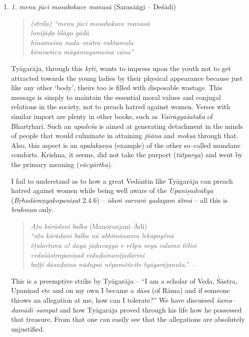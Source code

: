 \begin{enumerate}
\item 
 \textit{1. menu jūci mosabokave manasā} (Sarasāṅgi – Deśādi)

\begin{verse}
\textit{(strīla) “menu jūci mosabokave manasā}\\\textit{lonijāḍa līlāgu gādā}\\\textit{hīnamaina mala–mūtra–raktamula}\\\textit{kiravaṁcu māyāmayamaina cāna”}
\end{verse}

 Tyāgarāja, through this \textit{kṛti,} wants to impress upon the youth not to get attracted towards the young ladies by their physical appearance because just like any other ‘body’, theirs too is filled with disposable wastage. This message is simply to maintain the essential moral values and conjugal relations in the society, not to preach hatred against women. Verses with similar import are plenty in other books, such as \textit{Vairāgyaśataka} of Bhartṛhari. Such an \textit{upadeśa} is aimed at generating detachment in the minds of people that would culminate in attaining \textit{jñāna} and \textit{mokṣa} through that. Also, this aspect is an \textit{upalakṣaṇa} (example) of the other so–called mundane comforts. Krishna, it seems, did not take the purport (\textit{tātparya}) and went by the primary meaning (\textit{vācyārtha}).

 I fail to understand as to how a great Vedāntīn like Tyāgarāja can preach hatred against women while being well aware of the \textit{Upaniṣadvākya} (\textit{Bṛhadāraṇyakopaniṣat} 2.4.6) – \textit{idaṁ sarvaṁ yadayam ātmā} – all this is \textit{brahman} only.

\begin{verse}
\textit{Aṭu kārādani balka} (Manoranjani–Ādi)\\\textit{“aṭu kārādani balka nā abhimānamu lekapoyênā} \\\textit{êṭulortunu o! daya jūḍavayya e vêlpu seyu calamo têlisi}\\\textit{vedaśāstropaniṣad viduḍainanijadārini} \\\textit{baṭṭi dāsuḍaina nādupai nêpamêñcite tyāgarājanuta.}” –
\end{verse}

 This is a preemptive strike by Tyāgarāja – “I am a scholar of Veda, Śāstra, Upaniṣad etc and on my own I became a \textit{dāsa} (of Rāma) and if someone throws an allegation at me, how can I tolerate?” We have discussed \textit{śama–damādi–sampat} and how Tyāgarāja proved through his life how he possessed that treasure. From that one can easily see that the allegations are absolutely unjustified.


\end{enumerate}
